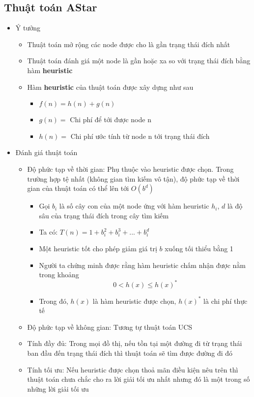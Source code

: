 \documentclass[a4paper, 12pt]{article}
\begin{document}
    \subsection{Thuật toán AStar}
    \begin{itemize}
        \item Ý tưởng
        \begin{itemize}
            \item Thuật toán mở rộng các node được cho là gần trạng thái đích nhất
            \item Thuật toán đánh giá một node là gần hoặc xa so với trạng thái đích bằng hàm \textbf{heuristic}
            \item Hàm \textbf{heuristic} của thuật toán được xây dựng như sau
            \begin{itemize}
                \item $f(n) = h(n) + g(n)$
                \item $g(n) = $ Chi phí để tới được node n
                \item $h(n) = $ Chi phí ước tính từ node n tới trạng thái đích
            \end{itemize}
        \end{itemize}

        \item Đánh giá thuật toán
        \begin{itemize}
            \item Độ phức tạp về thời gian: Phụ thuộc vào heuristic được chọn. Trong trường hợp tệ nhất (không gian tìm kiếm vô tận), độ phức tạp về thời gian của thuật toán có thể lên tới $O(b^d)$
            \begin{itemize}
                \item Gọi $b_i$ là số cây con của một node ứng với hàm heuristic $h_i$, $d$ là độ sâu của trạng thái đích trong cây tìm kiếm
                \item Ta có: $T(n) = 1 + b_i^2 + b_i^3 + ... + b_i^d$
                \item Một heuristic tốt cho phép giảm giá trị $b$ xuống tối thiểu bằng 1
                \item Người ta chứng minh được rằng hàm heuristic chấm nhận được nằm trong khoảng $$0 < h(x) \leq h(x)^*$$
                \item Trong đó, $h(x)$ là hàm heuristic được chọn, $h(x)^*$ là chi phí thực tế
            \end{itemize}
            \item Độ phức tạp về không gian: Tương tự thuật toán UCS
            \item Tính đầy đủ: Trong mọi đồ thị, nếu tồn tại một đường đi từ trạng thái ban đầu đến trạng thái đích thì thuật toán sẽ tìm được đường đi đó
            \item Tính tối ưu: Nếu heuristic được chọn thoả mãn điều kiện nêu trên thì thuật toán chưa chắc cho ra lời giải tối ưu nhất nhưng đó là một trong số những lời giải tối ưu
        \end{itemize}
    \end{itemize}
\end{document}
